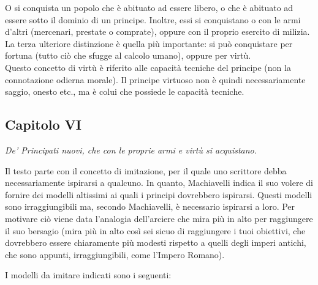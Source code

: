 \documentclass[a4paper]{article}
\begin{document}

O si conquista un popolo che è abituato ad essere libero, o che è abituato ad
essere sotto il dominio di un principe.
Inoltre, essi si conquistano o con le armi d'altri (mercenari, prestate o comprate),
oppure con il proprio esercito di milizia.
La terza ulteriore distinzione è quella più importante: si può conquistare per fortuna (tutto ciò che sfugge al calcolo umano),
oppure per virtù.
\\
Questo concetto di virtù è riferito alle capacità tecniche del principe (non la connotazione odierna morale).
Il principe virtuoso non è quindi necessariamente saggio, onesto etc., ma è colui che
possiede le capacità tecniche.

\pagebreak

\subsection{Capitolo VI}

\begin{center}
    \textit{
        De' Principati nuovi, che con le proprie armi e virtù si acquistano. 
    }
\end{center}

Il testo parte con il concetto di imitazione, per il quale uno scrittore
debba necessariamente ispirarsi a qualcuno.
In quanto, Machiavelli indica il suo volere di fornire dei modelli altissimi
ai quali i principi dovrebbero ispirarsi.
Questi modelli sono irraggiungibili ma, secondo Machiavelli, è necessario ispirarsi a loro.
Per motivare ciò viene data l'analogia dell'arciere che mira più in alto per raggiungere il suo bersagio
(mira più in alto così sei sicuo di raggiungere i tuoi obiettivi, che dovrebbero essere chiaramente
più modesti rispetto a quelli degli imperi antichi, che sono appunti, irraggiungibili, come l'Impero Romano).


I modelli da imitare indicati sono i seguenti:
\end{document}
